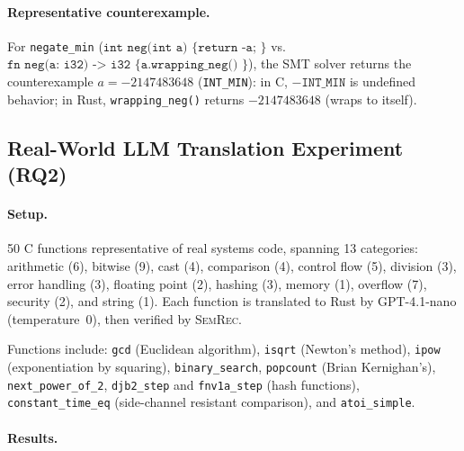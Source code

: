 \documentclass[11pt,a4paper]{article}
\begin{document}
\paragraph{Representative counterexample.}
For \texttt{negate\_min} ($\texttt{int neg(int a) \{ return -a; \}}$
vs.\ $\texttt{fn neg(a: i32) -> i32 \{ a.wrapping\_neg() \}}$),
the SMT solver returns the counterexample $a = -2147483648$
(\texttt{INT\_MIN}): in C, $-\texttt{INT\_MIN}$ is undefined behavior;
in Rust, \texttt{wrapping\_neg()} returns $-2147483648$ (wraps to itself).

\subsection{Real-World LLM Translation Experiment (RQ2)}\label{sec:eval-realworld}

\paragraph{Setup.} 50 C functions representative of real systems code,
spanning 13 categories: arithmetic (6), bitwise (9), cast (4),
comparison (4), control flow (5), division (3), error handling (3),
floating point (2), hashing (3), memory (1), overflow (7), security (2),
and string (1).  Each function is translated to Rust by GPT-4.1-nano
(temperature~0), then verified by \textsc{SemRec}.

Functions include: \texttt{gcd} (Euclidean algorithm), \texttt{isqrt}
(Newton's method), \texttt{ipow} (exponentiation by squaring),
\texttt{binary\_search}, \texttt{popcount} (Brian Kernighan's),
\texttt{next\_power\_of\_2}, \texttt{djb2\_step} and
\texttt{fnv1a\_step} (hash functions), \texttt{constant\_time\_eq}
(side-channel resistant comparison), and \texttt{atoi\_simple}.

\paragraph{Results.}
\end{document}
